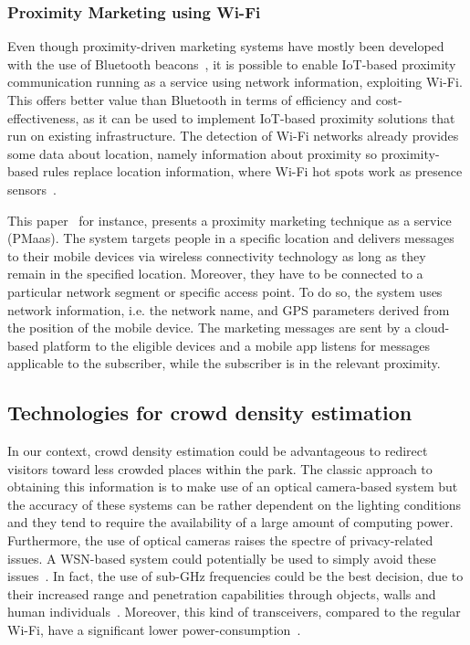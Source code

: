 \subsubsection{Proximity Marketing using Wi-Fi}\label{sec:proximity-marketing-wifi}
Even though proximity-driven marketing systems have mostly been developed with the use of Bluetooth beacons~\cite{mndebele2017iot}, it is possible to
enable IoT-based proximity communication running as a service using network information, exploiting Wi-Fi. This offers better value than Bluetooth in
terms of efficiency and cost-effectiveness, as it can be used to implement IoT-based proximity solutions that run on existing infrastructure.
The detection of Wi-Fi networks already provides some data about location, namely information about proximity so proximity-based rules replace location
information, where Wi-Fi hot spots work as presence sensors~\cite{dmitry2013network}.

This paper~\cite{mndebele2017iot} for instance, presents a proximity marketing technique as a service (PMaas). The system targets people in a specific location
and delivers messages to their mobile devices via wireless connectivity technology as long as they remain in the specified location. Moreover, they
have to be connected to a particular network segment or specific access point. To do so, the system uses network information, i.e. the network name,
and GPS parameters derived from the position of the mobile device. The marketing messages are sent by a cloud-based platform to the eligible devices and a mobile app listens for messages applicable to the subscriber, while the subscriber is in the relevant proximity.

\subsection{Technologies for crowd density estimation}\label{subsec:sub-ghz-wireless-sensor-network-for-crowd-density-estimation}
In our context, crowd density estimation could be advantageous to redirect visitors toward less crowded places within the park. The classic approach
to obtaining this information is to make use of an optical camera-based system but the accuracy of these systems can be rather dependent on the
lighting conditions and they tend to require the availability of a large amount of computing power. Furthermore, the use of optical cameras raises
the spectre of privacy-related issues. A WSN-based system could potentially be used to simply avoid these issues~\cite{denis2018large}. In fact, the
use of sub-GHz frequencies could be the best decision, due to their increased range and penetration capabilities through objects, walls and human
individuals~\cite{denis2018large}. Moreover, this kind of transceivers, compared to the regular Wi-Fi, have a significant lower
power-consumption~\cite{fudickar2014comparing}.

